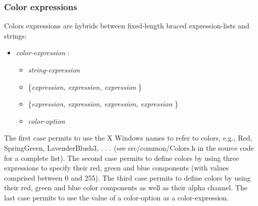 \documentclass[dvipdfmx, 9pt, a4paper]{article}
\numberwithin{equation}{section}
\begin{document}
\subsubsection{Color expressions}
Colors expressions are hybrids between fixed-length braced expression-lists and strings:
\begin{itemize}
\item {\it color-expression} : 
\begin{itemize}
\item {\it string-expression}
\item \{{\it expression, expression, expression} \}
\item \{{\it expression, expression, expression, expression} \}
\item {\it color-option}
\end{itemize}
\end{itemize}
The first case permits to use the X Windows names to refer to colors, e.g., Red, SpringGreen, LavenderBlush3, . . . (see src/common/Colors.h in the source code for a complete list). The second case permits to define colors by using three expressions to specify their red, green and blue components (with values comprised between 0 and 255). The third case permits to define colors by using their red, green and blue color components as well as their alpha channel. The last case permits to use the value of a color-option as a color-expression.
\end{document}
